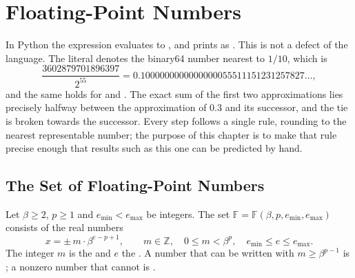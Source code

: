 \newcommand\sddemorows{%
\code{nextafter} & 581 & 78 & 1450 \\
\code{astype(int64)} & 118 & 28 & 247 \\
\code{isinf} & 65.0 & 17.2 & 65.1 \\}
\chapter{Floating-Point Numbers}
\label{ch:floating-point}


In Python the expression  evaluates to , and  prints as . This is not a defect of the language. The literal  denotes the binary64 number nearest to $1/10$, which is
\[
\frac{3602879701896397}{2^{55}}=0.1000000000000000055511151231257827\ldots,
\]
and the same holds for  and . The exact sum of the first two approximations lies precisely halfway between the approximation of $0.3$ and its successor, and the tie is broken towards the successor. Every step follows a single rule, rounding to the nearest representable number; the purpose of this chapter is to make that rule precise enough that results such as this one can be predicted by hand.

\section{The Set of Floating-Point Numbers}
\label{sec:fp-set}

\begin{definition}
\label{def:fp-set}
Let $\beta\ge2$, $p\ge1$ and $e_{\min}<e_{\max}$ be integers. The set $\mathbb F=\mathbb F(\beta,p,e_{\min},e_{\max})$ consists of the real numbers
\[
x=\pm\,m\cdot\beta^{e-p+1},\qquad m\in\mathbb Z,\quad 0\le m<\beta^p,\quad e_{\min}\le e\le e_{\max}.
\]
The integer $m$ is the  and $e$ the . A number that can be written with $m\ge\beta^{p-1}$ is ; a nonzero number that cannot is .
\end{definition}

